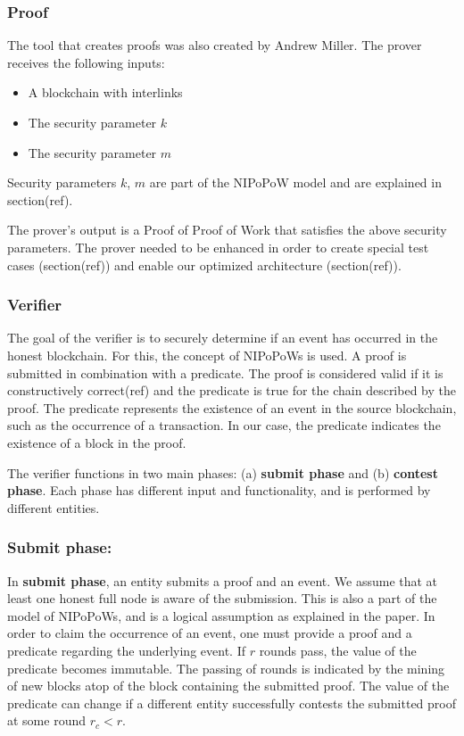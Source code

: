 
\subsubsection{Proof}

The tool that creates proofs was also created by Andrew Miller. The
prover receives the following inputs:

\begin{itemize}
    \item
        A blockchain with interlinks
    \item
        The security parameter $k$
    \item
        The security parameter $m$
\end{itemize}

Security parameters $k$, $m$ are part of the NIPoPoW model and are
explained in section(ref).

The prover’s output is a Proof of Proof of Work that satisfies the above
security parameters. The prover needed to be enhanced in order to create
special test cases (section(ref)) and enable our optimized architecture
(section(ref)).


\subsubsection{Verifier}

The goal of the verifier is to securely determine if an event has occurred in
the honest blockchain. For this, the concept of NIPoPoWs is used. A proof is
submitted in combination with a predicate. The proof is considered valid if it
is constructively correct(ref) and the predicate is true for the chain
described by the proof. The predicate represents the existence of an event
in the source blockchain, such as the occurrence of a transaction. In our case,
the predicate indicates the existence of a block in the proof.


The verifier functions in two main phases: (a) \textbf{submit phase} and (b)
\textbf{contest phase}. Each phase has different input and functionality, and
is performed by different entities.

\subsubsection{Submit phase:} In \textbf{submit phase}, an entity submits a proof
and an event. We assume that at least one honest full node is aware of the
submission. This is also a part of the model of NIPoPoWs, and is a logical
assumption as explained in the paper. In order to claim the occurrence of an
event, one must provide a proof and a predicate regarding the underlying event.
If $r$ rounds pass, the value of the predicate becomes immutable. The passing
of rounds is indicated by the mining of new blocks atop of the block containing
the submitted proof. The value of the predicate can change if a different entity
successfully contests the submitted proof at some round $r_{c} < r$.

